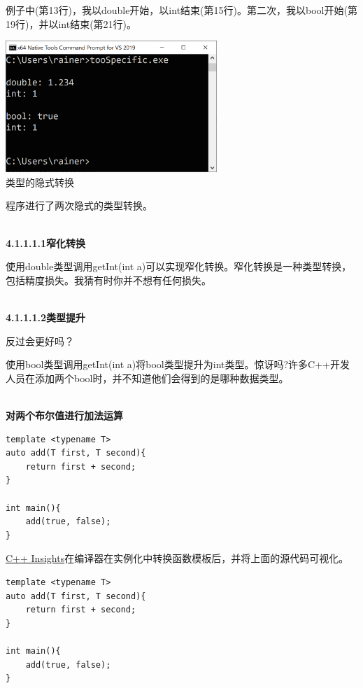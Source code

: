 例子中(第13行)，我以double开始，以int结束(第15行)。第二次，我以bool开始(第19行)，并以int结束(第21行)。

\begin{center}
\includegraphics[width=0.6\textwidth]{content/3/chapter4/images/3.png}\\
类型的隐式转换
\end{center}

程序进行了两次隐式的类型转换。

\hspace*{\fill} \\ %
\noindent
\textbf{4.1.1.1.1\hspace{0.2cm}窄化转换}

使用double类型调用getInt(int a)可以实现窄化转换。窄化转换是一种类型转换，包括精度损失。我猜有时你并不想有任何损失。

\hspace*{\fill} \\ %
\noindent
\textbf{4.1.1.1.2\hspace{0.2cm}类型提升}

反过会更好吗？

使用bool类型调用getInt(int a)将bool类型提升为int类型。惊讶吗?许多C++开发人员在添加两个bool时，并不知道他们会得到的是哪种数据类型。

\hspace*{\fill} \\ %
\noindent
\textbf{对两个布尔值进行加法运算}
\begin{lstlisting}[style=styleCXX]
template <typename T>
auto add(T first, T second){
	return first + second;
}

int main(){
	add(true, false);
}
\end{lstlisting}

\href{https://cppinsights.io/s/9bd14f99}{C++ Insights}在编译器在实例化中转换函数模板后，并将上面的源代码可视化。

\begin{lstlisting}[style=styleCXX]
template <typename T>
auto add(T first, T second){
	return first + second;
}

int main(){
	add(true, false);
}
\end{lstlisting}

